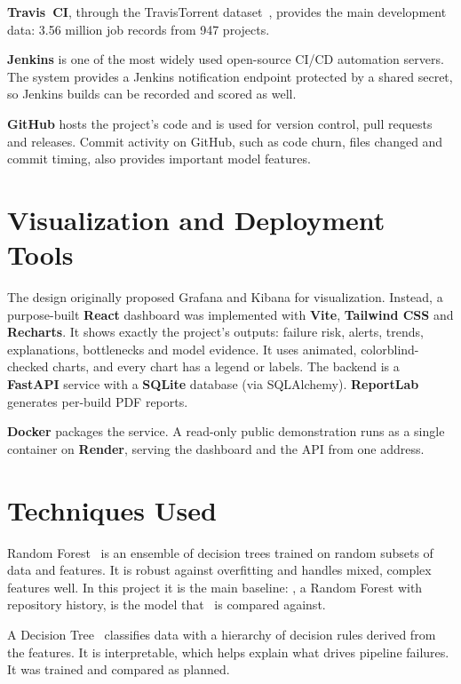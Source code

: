 \textbf{Travis~CI}, through the TravisTorrent dataset~\cite{beller2017travistorrent}, provides the main development data: 3.56 million job records from 947 projects.

\textbf{Jenkins} is one of the most widely used open-source CI/CD automation servers. The system provides a Jenkins notification endpoint protected by a shared secret, so Jenkins builds can be recorded and scored as well.

\textbf{GitHub} hosts the project's code and is used for version control, pull requests and releases. Commit activity on GitHub, such as code churn, files changed and commit timing, also provides important model features.

\section{Visualization and Deployment Tools}
\label{sec:viztools}
The design originally proposed Grafana and Kibana for visualization. Instead, a purpose-built \textbf{React} dashboard was implemented with \textbf{Vite}, \textbf{Tailwind CSS} and \textbf{Recharts}. It shows exactly the project's outputs: failure risk, alerts, trends, explanations, bottlenecks and model evidence. It uses animated, colorblind-checked charts, and every chart has a legend or labels. The backend is a \textbf{FastAPI} service with a \textbf{SQLite} database (via SQLAlchemy). \textbf{ReportLab} generates per-build PDF reports.

\textbf{Docker} packages the service. A read-only public demonstration runs as a single container on \textbf{Render}, serving the dashboard and the API from one address.

\section{Techniques Used}
\label{sec:techniques}

Random Forest~\cite{breiman2001random} is an ensemble of decision trees trained on random subsets of data and features. It is robust against overfitting and handles mixed, complex features well. In this project it is the main baseline: \tierC, a Random Forest with repository history, is the model that \tierE\ is compared against.

A Decision Tree~\cite{quinlan1986induction} classifies data with a hierarchy of decision rules derived from the features. It is interpretable, which helps explain what drives pipeline failures. It was trained and compared as planned.

